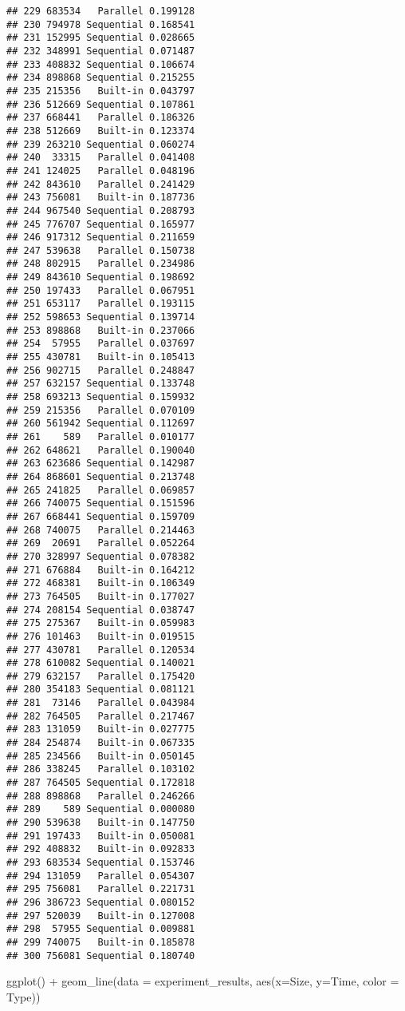 \documentclass[
]{article}
\newenvironment{Shaded}{\begin{snugshade}}{\end{snugshade}}
\newcommand{\AttributeTok}[1]{\textcolor[rgb]{0.77,0.63,0.00}{#1}}
\newcommand{\FunctionTok}[1]{\textcolor[rgb]{0.00,0.00,0.00}{#1}}
\newcommand{\NormalTok}[1]{#1}
\newcommand{\SpecialCharTok}[1]{\textcolor[rgb]{0.00,0.00,0.00}{#1}}
\begin{document}
\begin{verbatim}
## 229 683534   Parallel 0.199128
## 230 794978 Sequential 0.168541
## 231 152995 Sequential 0.028665
## 232 348991 Sequential 0.071487
## 233 408832 Sequential 0.106674
## 234 898868 Sequential 0.215255
## 235 215356   Built-in 0.043797
## 236 512669 Sequential 0.107861
## 237 668441   Parallel 0.186326
## 238 512669   Built-in 0.123374
## 239 263210 Sequential 0.060274
## 240  33315   Parallel 0.041408
## 241 124025   Parallel 0.048196
## 242 843610   Parallel 0.241429
## 243 756081   Built-in 0.187736
## 244 967540 Sequential 0.208793
## 245 776707 Sequential 0.165977
## 246 917312 Sequential 0.211659
## 247 539638   Parallel 0.150738
## 248 802915   Parallel 0.234986
## 249 843610 Sequential 0.198692
## 250 197433   Parallel 0.067951
## 251 653117   Parallel 0.193115
## 252 598653 Sequential 0.139714
## 253 898868   Built-in 0.237066
## 254  57955   Parallel 0.037697
## 255 430781   Built-in 0.105413
## 256 902715   Parallel 0.248847
## 257 632157 Sequential 0.133748
## 258 693213 Sequential 0.159932
## 259 215356   Parallel 0.070109
## 260 561942 Sequential 0.112697
## 261    589   Parallel 0.010177
## 262 648621   Parallel 0.190040
## 263 623686 Sequential 0.142987
## 264 868601 Sequential 0.213748
## 265 241825   Parallel 0.069857
## 266 740075 Sequential 0.151596
## 267 668441 Sequential 0.159709
## 268 740075   Parallel 0.214463
## 269  20691   Parallel 0.052264
## 270 328997 Sequential 0.078382
## 271 676884   Built-in 0.164212
## 272 468381   Built-in 0.106349
## 273 764505   Built-in 0.177027
## 274 208154 Sequential 0.038747
## 275 275367   Built-in 0.059983
## 276 101463   Built-in 0.019515
## 277 430781   Parallel 0.120534
## 278 610082 Sequential 0.140021
## 279 632157   Parallel 0.175420
## 280 354183 Sequential 0.081121
## 281  73146   Parallel 0.043984
## 282 764505   Parallel 0.217467
## 283 131059   Built-in 0.027775
## 284 254874   Built-in 0.067335
## 285 234566   Built-in 0.050145
## 286 338245   Parallel 0.103102
## 287 764505 Sequential 0.172818
## 288 898868   Parallel 0.246266
## 289    589 Sequential 0.000080
## 290 539638   Built-in 0.147750
## 291 197433   Built-in 0.050081
## 292 408832   Built-in 0.092833
## 293 683534 Sequential 0.153746
## 294 131059   Parallel 0.054307
## 295 756081   Parallel 0.221731
## 296 386723 Sequential 0.080152
## 297 520039   Built-in 0.127008
## 298  57955 Sequential 0.009881
## 299 740075   Built-in 0.185878
## 300 756081 Sequential 0.180740
\end{verbatim}

\begin{Shaded}
\begin{Highlighting}[]
\FunctionTok{ggplot}\NormalTok{() }\SpecialCharTok{+}               
  \FunctionTok{geom\_line}\NormalTok{(}\AttributeTok{data =}\NormalTok{ experiment\_results, }\FunctionTok{aes}\NormalTok{(}\AttributeTok{x=}\NormalTok{Size, }\AttributeTok{y=}\NormalTok{Time, }\AttributeTok{color =}\NormalTok{ Type))}
\end{Highlighting}
\end{Shaded}
\end{document}
